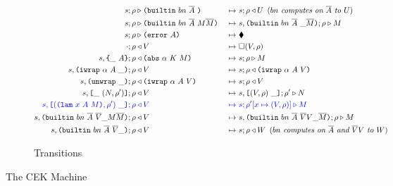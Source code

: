 \documentclass[../plutus-core-specification.tex]{subfiles}
\begin{document}
\begin{figure}[!ht]
\begin{subfigure}[c]{\linewidth}
{\begin{alignat*}{2}
       s; \rho &\compute \builtin{bn}{\repetition{A}}{} &~\mapsto~& s;\rho \return U \enspace (\textit{$bn$ computes on $\repetition{A}$ to $U$})\\
       s; \rho &\compute \builtin{bn}{\repetition{A}}{M \repetition{M}} &~\mapsto~& s,\inBuiltin{bn}{\repetition{A}}{}{\_}{\repetition{M}};\rho \compute M\\
       s; \rho &\compute \error{A} &~\mapsto~& \ckerror{}\\
       \cdot; \rho &\return V &~\mapsto~& \square (V, \rho)\\
       s,\inInstLeftFrame{A}; \rho &\return \abs{\alpha}{K}{M} &~\mapsto~& s;\rho \compute{M} \\
       s,\inWrapRightFrame{\alpha}{A}; \rho &\return V &~\mapsto~& s;\rho \return \wrap{\alpha}{A}{V}\\
       s,\inUnwrapFrame{}; \rho &\return \wrap{\alpha}{A}{V} &~\mapsto~& s;\rho \return V\\
       s,\inAppLeftFrame{(N,\rho^{\prime})}; \rho &\return V &~\mapsto~& s, \inAppRightFrame{(V,\rho)};\rho^{\prime} \compute N\\
       \blue{s,\inAppRightFrame{(\lam{x}{A}{M}, \rho^{\prime})}; \rho} &\breturn V &~\bmapsto~& \blue{s;\rho^{\prime}[x\mapsto (V,\rho)] \compute M}\\  %
       s,  \inBuiltin{bn}{\repetition{A}}{\repetition{V}}{\_}{M \repetition{M}}{}; \rho&\return V &~\mapsto~& s, \inBuiltin{bn}{\repetition{A}}{\repetition{V} V}{\_}{\repetition{M}};\rho \compute M\\
       s,\inBuiltin {bn} {\repetition{A}} {\repetition{V}}{\_}{}; \rho &\return V 
                                                 &~\mapsto~& s;\rho \return W \enspace (\textit{$bn$ computes on $\repetition{A}$ and $\repetition{V}V$ to $W$})\\
\end{alignat*}
}
\caption{Transitions}
\end{subfigure}
\caption{The CEK Machine}\label{fig:cek-machine}
\end{figure}
\end{document}
